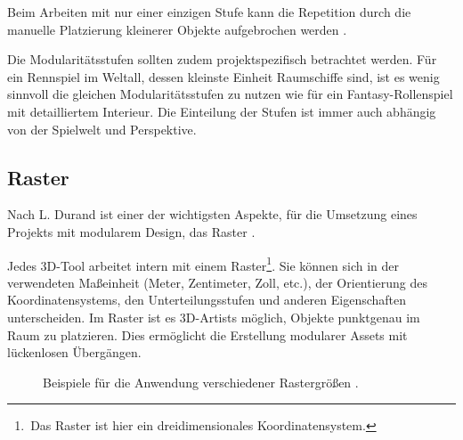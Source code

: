 \par
Beim Arbeiten mit nur einer einzigen Stufe kann die Repetition durch die manuelle Platzierung kleinerer Objekte aufgebrochen werden \parencite{Perry}.
\par
Die Modularitätsstufen sollten zudem projektspezifisch betrachtet werden. Für ein Rennspiel im Weltall, dessen kleinste Einheit Raumschiffe sind, ist es wenig sinnvoll die gleichen Modularitätsstufen zu nutzen wie für ein Fantasy-Rollenspiel mit detailliertem Interieur. Die Einteilung der Stufen ist immer auch abhängig von der Spielwelt und Perspektive.
\enlargethispage{10.5pt}
\subsection{Raster}\label{Rasterkapitel}
Nach L. Durand ist einer der wichtigsten Aspekte, für die Umsetzung eines Projekts mit modularem Design, das Raster \parencite{ForHonor}.
\par
Jedes 3D-Tool arbeitet intern mit einem Raster\footnote{\,Das Raster ist hier ein dreidimensionales Koordinatensystem.}. Sie können sich in der verwendeten Maßeinheit (Meter, Zentimeter, Zoll, etc.), der Orientierung des Koordinatensystems, den Unterteilungsstufen und anderen Eigenschaften unterscheiden. Im Raster ist es 3D-Artists möglich, Objekte punktgenau im Raum zu platzieren. Dies ermöglicht die Erstellung modularer Assets mit lückenlosen Übergängen. \parencite{Mader}
\vspace{-10.5pt}
\begin{figure}[H]
\label{RasterBilder}
\centering
  \qquad
  \caption{Beispiele für die Anwendung verschiedener Rastergrößen \parencite{Mader}.}%
\end{figure}
